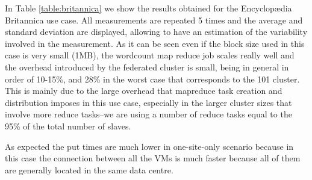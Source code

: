 

In Table \ref{table:britannica} we show the results obtained for the Encyclop{\ae}dia Britannica use case. All measurements are repeated 5 times and the average and standard deviation are displayed, allowing to have an estimation of the variability involved in the measurement. As it can be seen even if the block size used in this case is very small (1MB), the wordcount map reduce job scales really well and the overhead introduced by the federated cluster is small, being in general in order of 10-15\%, and 28\% in the worst case that corresponds to the 101 cluster. This is mainly due to the large overhead that mapreduce task creation and distribution imposes in this use case, especially in the larger cluster sizes that involve more reduce tasks--we are using a number of reduce tasks equal to the 95\% of the total number of slaves.

As expected the put times are much lower in one-site-only scenario because in this case the connection between all the VMs is much faster because all of them are generally located in the same data centre.

